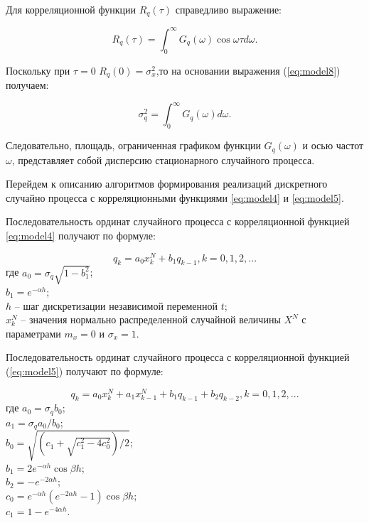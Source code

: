 Для корреляционной функции ${R}_{q}(\tau)$ справедливо выражение:

\begin{equation} \label{eq:model8}
R_q(\tau) = \int_{0}^{\infty} G_q(\omega) \cos\omega\tau d\omega.
\end{equation}

Поскольку при $\tau = 0$ $R_q(0) = {\sigma}_{x}^{2}$,то на основании выражения (\ref{eq:model8}) получаем:

\begin{equation} \label{eq:model9}
{\sigma}_{q}^{2} = \int_{0}^{\infty} G_q(\omega) d\omega.
\end{equation}

Следовательно, площадь, ограниченная графиком функции $G_q(\omega)$ и осью
частот $\omega$, представляет собой дисперсию стационарного случайного процесса.

Перейдем к описанию алгоритмов формирования реализаций дискретного
случайно процесса с корреляционными функциями \ref{eq:model4} и \ref{eq:model5}.

Последовательность ординат случайного процесса с корреляционной
функцией \ref{eq:model4} получают по формуле:

\begin{equation} \label{eq:model10}
{q}_{k} = a_0 x_{k}^{N} + b_1 q_{k-1}, k=0,1,2,...
\end{equation}
где $a_0 = \sigma_q \sqrt{1 - b_1^2}$;\\
$b_1 = e^{-\alpha h}$;\\
$h$ -- шаг дискретизации независимой переменной $t$;\\
$x_k^N$ -- значения нормально распределенной случайной величины $X^N$ с
параметрами $m_x = 0$ и $\sigma_x = 1$.

Последовательность ординат случайного процесса с корреляционной
функцией (\ref{eq:model5}) получают по формуле:

\begin{equation} \label{eq:model11}
{q}_{k} = a_0 x_{k}^{N} + a_1 x_{k-1}^{N} +  b_1 q_{k-1} +  b_2 q_{k-2}, k=0,1,2,...
\end{equation}
где $a_0 = \sigma_q b_0$;\\
$a_1 = \sigma_q a_0 / b_0$;\\
$b_0 = \sqrt{(c_1 + \sqrt{c_1^2 - 4c_0^2})/2}$;\\
$b_1 = 2e^{-\alpha h} \cos\beta h$;\\
$b_2 = -e^{-2\alpha h}$;\\
$c_0 = e^{-\alpha h} (e^{-2\alpha h} - 1) \cos\beta h$;\\
$c_1 = 1 - e^{-4\alpha h}$.

